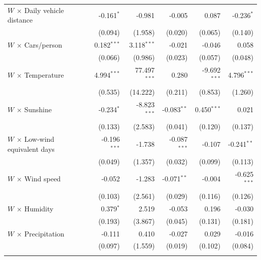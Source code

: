 \begin{longtable}{lrrrrr}
\addlinespace[1pt]
$W$ $\times$ Daily vehicle distance & -0.161$^{*}$ & -0.981 & -0.005 & 0.087 & -0.236$^{*}$ \\
 & (0.094) & (1.958) & (0.020) & (0.065) & (0.140) \\
\addlinespace[1pt]
$W$ $\times$ Cars/person & 0.182$^{***}$ & 3.118$^{***}$ & -0.021 & -0.046 & 0.058 \\
 & (0.066) & (0.986) & (0.023) & (0.057) & (0.048) \\
\addlinespace[1pt]
$W$ $\times$ Temperature & 4.994$^{***}$ & 77.497$^{***}$ & 0.280 & -9.692$^{***}$ & 4.796$^{***}$ \\
 & (0.535) & (14.222) & (0.211) & (0.853) & (1.260) \\
\addlinespace[1pt]
$W$ $\times$ Sunshine & -0.234$^{*}$ & -8.823$^{***}$ & -0.083$^{**}$ & 0.450$^{***}$ & 0.021 \\
 & (0.133) & (2.583) & (0.041) & (0.120) & (0.137) \\
\addlinespace[1pt]
$W$ $\times$ Low-wind equivalent days & -0.196$^{***}$ & -1.738 & -0.087$^{***}$ & -0.107 & -0.241$^{**}$ \\
 & (0.049) & (1.357) & (0.032) & (0.099) & (0.113) \\
\addlinespace[1pt]
$W$ $\times$ Wind speed & -0.052 & -1.283 & -0.071$^{**}$ & -0.004 & -0.625$^{***}$ \\
 & (0.103) & (2.561) & (0.029) & (0.116) & (0.126) \\
\addlinespace[1pt]
$W$ $\times$ Humidity & 0.379$^{*}$ & 2.519 & -0.053 & 0.196 & -0.030 \\
 & (0.193) & (3.867) & (0.045) & (0.131) & (0.181) \\
\addlinespace[1pt]
$W$ $\times$ Precipitation & -0.111 & 0.410 & -0.027 & 0.029 & -0.016 \\
 & (0.097) & (1.559) & (0.019) & (0.102) & (0.084) \\
\addlinespace[1pt]
\end{longtable}
